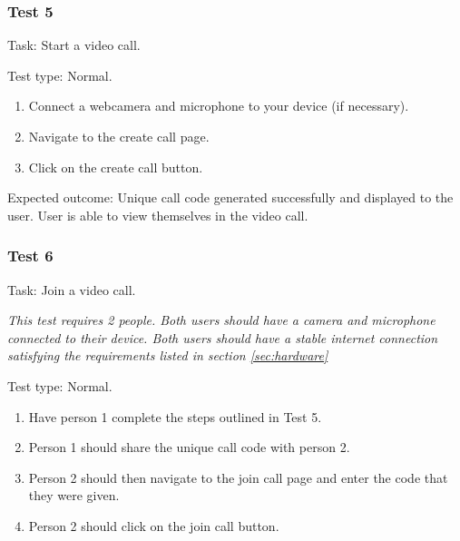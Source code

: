 {\color{gray} \hrulefill}

\vspace{0.2cm}

\subsubsection{Test 5}

{\sffamily Task:} Start a video call.\\ 

{\color{gray} \hrulefill}

{\sffamily Test type: Normal.}\\

\begin{enumerate}
  \item Connect a webcamera and microphone to your device (if necessary).
  \item Navigate to the create call page.
  \item Click on the create call button.
\end{enumerate}

{\sffamily Expected outcome:} Unique call code generated successfully 
and displayed to the user. User is able to view themselves in 
the video call.\\

{\color{gray} \hrulefill}

\vspace{0.2cm}

\subsubsection{Test 6}

{\sffamily Task:} Join a video call.\\ \vspace{0.2cm}

\textit{This test requires 2 people. Both users should have a camera 
and microphone connected to their device. Both users should have a 
stable internet connection satisfying the requirements listed in section \ref{sec:hardware}}\\

{\color{gray} \hrulefill}

{\sffamily Test type: Normal.}\\

\begin{enumerate}
  \item Have person 1 complete the steps outlined in Test 5.
  \item Person 1 should share the unique call code with person 2.
  \item Person 2 should then navigate to the join call page and enter the code that they were given.
  \item Person 2 should click on the join call button.
\end{enumerate}

